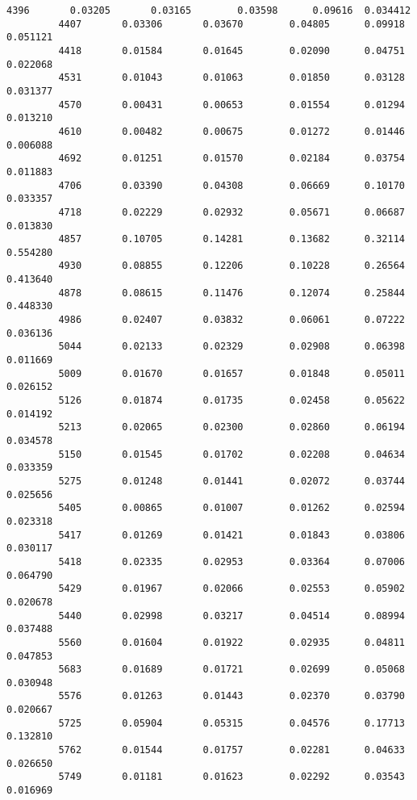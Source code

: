 \documentclass[11pt]{article}
\begin{document}
\begin{Verbatim}[commandchars=\\\{\}]
         4396       0.03205       0.03165        0.03598      0.09616  0.034412   
         4407       0.03306       0.03670        0.04805      0.09918  0.051121   
         4418       0.01584       0.01645        0.02090      0.04751  0.022068   
         4531       0.01043       0.01063        0.01850      0.03128  0.031377   
         4570       0.00431       0.00653        0.01554      0.01294  0.013210   
         4610       0.00482       0.00675        0.01272      0.01446  0.006088   
         4692       0.01251       0.01570        0.02184      0.03754  0.011883   
         4706       0.03390       0.04308        0.06669      0.10170  0.033357   
         4718       0.02229       0.02932        0.05671      0.06687  0.013830   
         4857       0.10705       0.14281        0.13682      0.32114  0.554280   
         4930       0.08855       0.12206        0.10228      0.26564  0.413640   
         4878       0.08615       0.11476        0.12074      0.25844  0.448330   
         4986       0.02407       0.03832        0.06061      0.07222  0.036136   
         5044       0.02133       0.02329        0.02908      0.06398  0.011669   
         5009       0.01670       0.01657        0.01848      0.05011  0.026152   
         5126       0.01874       0.01735        0.02458      0.05622  0.014192   
         5213       0.02065       0.02300        0.02860      0.06194  0.034578   
         5150       0.01545       0.01702        0.02208      0.04634  0.033359   
         5275       0.01248       0.01441        0.02072      0.03744  0.025656   
         5405       0.00865       0.01007        0.01262      0.02594  0.023318   
         5417       0.01269       0.01421        0.01843      0.03806  0.030117   
         5418       0.02335       0.02953        0.03364      0.07006  0.064790   
         5429       0.01967       0.02066        0.02553      0.05902  0.020678   
         5440       0.02998       0.03217        0.04514      0.08994  0.037488   
         5560       0.01604       0.01922        0.02935      0.04811  0.047853   
         5683       0.01689       0.01721        0.02699      0.05068  0.030948   
         5576       0.01263       0.01443        0.02370      0.03790  0.020667   
         5725       0.05904       0.05315        0.04576      0.17713  0.132810   
         5762       0.01544       0.01757        0.02281      0.04633  0.026650   
         5749       0.01181       0.01623        0.02292      0.03543  0.016969   
         

\end{Verbatim}
\end{document}
